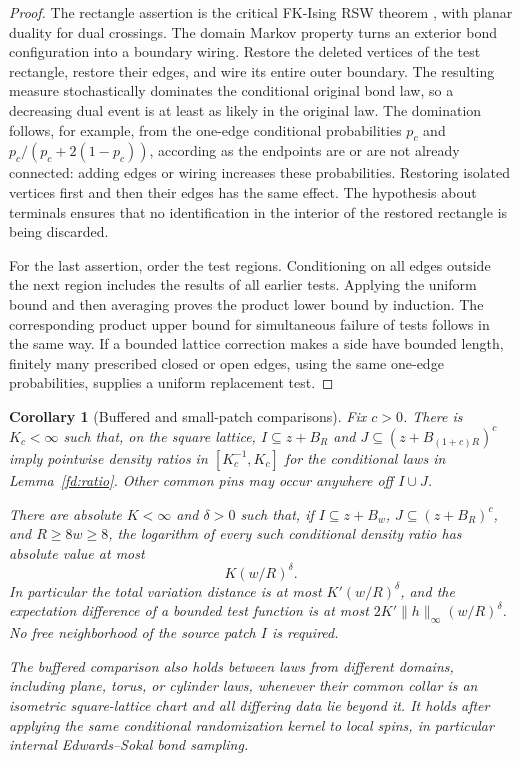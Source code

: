 \documentclass[11pt]{article}
\newtheorem{corollary}[theorem]{Corollary}
\theoremstyle{definition}
\theoremstyle{remark}
\numberwithin{equation}{section}
\begin{document}
\begin{proof}
The rectangle assertion is the critical FK-Ising RSW theorem
\cite[arXiv version~1, Theorem~1]{DHN2011}, with planar duality for dual crossings.
The domain Markov property turns an exterior bond configuration into a
boundary wiring.  Restore the deleted vertices of the test rectangle,
restore their edges, and wire its entire outer boundary.  The resulting
measure stochastically dominates the conditional original bond law, so a
decreasing dual event is at least as likely in the original law.  The
domination follows, for example, from the one-edge conditional probabilities
\(p_c\) and \(p_c/(p_c+2(1-p_c))\), according as the endpoints are or are
not already connected: adding edges or wiring increases these probabilities.
Restoring isolated vertices first and then their edges has the same effect.
The hypothesis about terminals ensures that no identification in the
interior of the restored rectangle is being discarded.

For the last assertion, order the test regions.  Conditioning on all edges
outside the next region includes the results of all earlier tests.  Applying
the uniform bound and then averaging proves the product lower bound by
induction.  The corresponding product upper bound for simultaneous failure
of tests follows in the same way.  If a bounded lattice correction makes
a side have bounded length, finitely many prescribed closed or open edges,
using the same one-edge probabilities, supplies a uniform replacement test.
\end{proof}

\begin{corollary}[Buffered and small-patch comparisons]
\label{fd:buffered-ratio}\label{fd:patch-ratio}
Fix \(c>0\).  There is \(K_c<\infty\) such that, on the square lattice,
\(I\subseteq z+B_R\) and \(J\subseteq(z+B_{(1+c)R})^c\) imply
pointwise density ratios in \([K_c^{-1},K_c]\) for the conditional laws
in Lemma~\ref{fd:ratio}.  Other common pins may occur anywhere off
\(I\cup J\).

There are absolute \(K<\infty\) and \(\delta>0\) such that, if
\(I\subseteq z+B_w\), \(J\subseteq(z+B_R)^c\), and \(R\ge8w\ge8\),
the logarithm of every such conditional density ratio has absolute value
at most
\begin{equation}
 K(w/R)^\delta.
 \label{fd:patch-power}
\end{equation}
In particular the total variation distance is at most
\(K'(w/R)^\delta\), and the expectation difference of a bounded test
function is at most \(2K'\|h\|_\infty(w/R)^\delta\).
No free neighborhood of the source patch \(I\) is required.

The buffered comparison also holds between laws from different domains,
including plane, torus, or cylinder laws, whenever their common collar
is an isometric square-lattice chart and all differing data lie beyond it.
It holds after applying the same conditional randomization kernel to local
spins, in particular internal Edwards--Sokal bond sampling.
\end{corollary}
\end{document}
